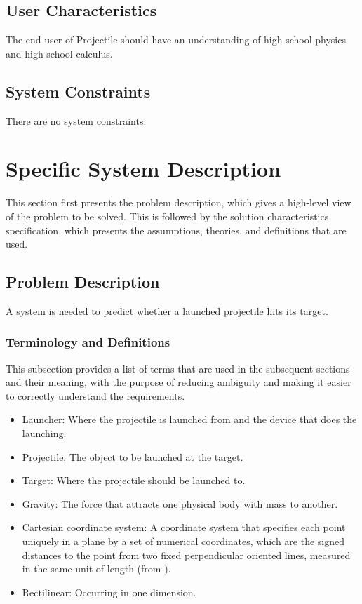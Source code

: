 \documentclass[12pt]{article}
\begin{document}
\subsection{User Characteristics}
\label{Sec:UserChars}
The end user of Projectile should have an understanding of high school physics and high school calculus.

\subsection{System Constraints}
\label{Sec:SysConstraints}
There are no system constraints.

\section{Specific System Description}
\label{Sec:SpecSystDesc}
This section first presents the problem description, which gives a high-level view of the problem to be solved. This is followed by the solution characteristics specification, which presents the assumptions, theories, and definitions that are used.

\subsection{Problem Description}
\label{Sec:ProbDesc}
A system is needed to predict whether a launched projectile hits its target.

\subsubsection{Terminology and Definitions}
\label{Sec:TermDefs}
This subsection provides a list of terms that are used in the subsequent sections and their meaning, with the purpose of reducing ambiguity and making it easier to correctly understand the requirements.

\begin{itemize}
\item{Launcher: Where the projectile is launched from and the device that does the launching.}
\item{Projectile: The object to be launched at the target.}
\item{Target: Where the projectile should be launched to.}
\item{Gravity: The force that attracts one physical body with mass to another.}
\item{Cartesian coordinate system: A coordinate system that specifies each point uniquely in a plane by a set of numerical coordinates, which are the signed distances to the point from two fixed perpendicular oriented lines, measured in the same unit of length (from \cite{cartesianWiki}).}
\item{Rectilinear: Occurring in one dimension.}
\end{itemize}
\end{document}
